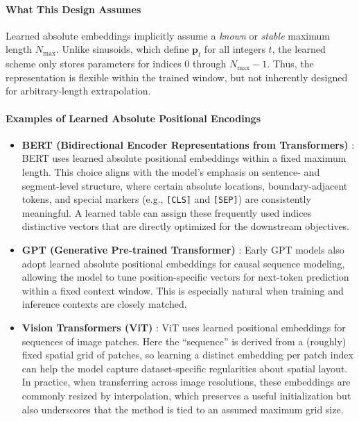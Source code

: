 \paragraph{What This Design Assumes}
\noindent
Learned absolute embeddings implicitly assume a \emph{known} or \emph{stable} maximum length \(N_{\max}\).
Unlike sinusoids, which define \(\mathbf{p}_t\) for all integers \(t\), the learned scheme only stores parameters for indices \(0\) through \(N_{\max}-1\).
Thus, the representation is flexible within the trained window, but not inherently designed for arbitrary-length extrapolation.

\paragraph{Examples of Learned Absolute Positional Encodings}
\begin{itemize}
	\item \textbf{BERT (Bidirectional Encoder Representations from Transformers)} \cite{devlin2019_bert}:
	BERT uses learned absolute positional embeddings within a fixed maximum length.
	This choice aligns with the model's emphasis on sentence- and segment-level structure, where certain absolute locations, boundary-adjacent tokens, and special markers (e.g., \texttt{[CLS]} and \texttt{[SEP]}) are consistently meaningful.
	A learned table can assign these frequently used indices distinctive vectors that are directly optimized for the downstream objectives.
	
	\item \textbf{GPT (Generative Pre-trained Transformer)} \cite{radford2019_language}:
	Early GPT models also adopt learned absolute positional embeddings for causal sequence modeling,
	allowing the model to tune position-specific vectors for next-token prediction within a fixed context window.
	This is especially natural when training and inference contexts are closely matched.
	
	\item \textbf{Vision Transformers (ViT)} \cite{vit2020_transformers}:
	ViT uses learned positional embeddings for sequences of image patches.
	Here the ``sequence'' is derived from a (roughly) fixed spatial grid of patches,
	so learning a distinct embedding per patch index can help the model capture dataset-specific regularities about spatial layout.
	In practice, when transferring across image resolutions, these embeddings are commonly resized by interpolation,
	which preserves a useful initialization but also underscores that the method is tied to an assumed maximum grid size.
\end{itemize}

